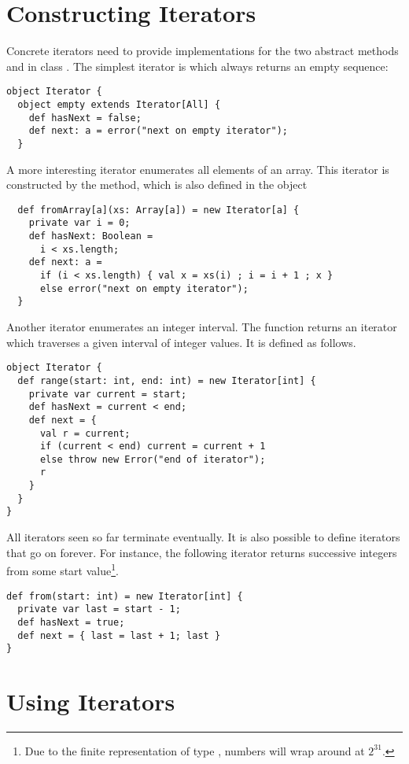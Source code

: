 \documentclass[a4paper,12pt,twoside,titlepage]{book}
\begin{document}
{\section{Constructing Iterators}

Concrete iterators need to provide implementations for the two
abstract methods  and  in class
. The simplest iterator is  which
always returns an empty sequence:
\begin{lstlisting}
object Iterator {
  object empty extends Iterator[All] {
    def hasNext = false;
    def next: a = error("next on empty iterator");
  }
\end{lstlisting}
A more interesting iterator enumerates all elements of an array. This
iterator is constructed by the  method, which is also defined in the object 
\begin{lstlisting}
  def fromArray[a](xs: Array[a]) = new Iterator[a] {
    private var i = 0;
    def hasNext: Boolean = 
      i < xs.length;
    def next: a = 
      if (i < xs.length) { val x = xs(i) ; i = i + 1 ; x }
      else error("next on empty iterator");
  }
\end{lstlisting}
Another iterator enumerates an integer interval.  The
 function returns an iterator which traverses a
given interval of integer values. It is defined as follows.
\begin{lstlisting}
object Iterator {
  def range(start: int, end: int) = new Iterator[int] {
    private var current = start;
    def hasNext = current < end;
    def next = {
      val r = current;
      if (current < end) current = current + 1
      else throw new Error("end of iterator");
      r
    }
  }
}
\end{lstlisting}
All iterators seen so far terminate eventually. It is also possible to
define iterators that go on forever. For instance, the following
iterator returns successive integers from some start
value\footnote{Due to the finite representation of type ,
numbers will wrap around at $2^31$.}.
\begin{lstlisting}
def from(start: int) = new Iterator[int] {
  private var last = start - 1;
  def hasNext = true;
  def next = { last = last + 1; last }
}
\end{lstlisting}

\section{Using Iterators}

}
\end{document}
